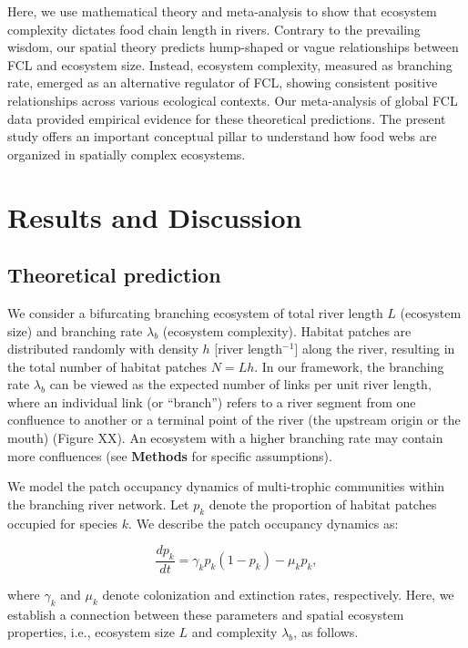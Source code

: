 \documentclass[11pt, class=article, crop=false]{standalone}
\begin{document}
Here, we use mathematical theory and meta-analysis to show that ecosystem complexity dictates food chain length in rivers.
Contrary to the prevailing wisdom, our spatial theory predicts hump-shaped or vague relationships between FCL and ecosystem size.
Instead, ecosystem complexity, measured as branching rate, emerged as an alternative regulator of FCL, showing consistent positive relationships across various ecological contexts.
Our meta-analysis of global FCL data provided empirical evidence for these theoretical predictions.
The present study offers an important conceptual pillar to understand how food webs are organized in spatially complex ecosystems.

\section{Results and Discussion}

\subsection{Theoretical prediction}

We consider a bifurcating branching ecosystem of total river length $L$ (ecosystem size) and branching rate $\lambda_b$ (ecosystem complexity).
Habitat patches are distributed randomly with density $h$ [river length$^{-1}$] along the river, resulting in the total number of habitat patches $N = Lh$.
In our framework, the branching rate $\lambda_b$ can be viewed as the expected number of links per unit river length, where an individual link (or ``branch'') refers to a river segment from one confluence to another or a terminal point of the river (the upstream origin or the mouth) (Figure XX).
An ecosystem with a higher branching rate may contain more confluences (see \textbf{Methods} for specific assumptions).

We model the patch occupancy dynamics of multi-trophic communities within the branching river network.
Let $p_k$ denote the proportion of habitat patches occupied for species $k$.
We describe the patch occupancy dynamics as:

\begin{equation}
    \frac{dp_k}{dt} = \gamma_{k} p_k (1 - p_k) - \mu_k p_k,
    \label{eq:model0}
\end{equation}

where $\gamma_k$ and $\mu_k$ denote colonization and extinction rates, respectively.
Here, we establish a connection between these parameters and spatial ecosystem properties, i.e., ecosystem size $L$ and complexity $\lambda_b$, as follows.
\end{document}
